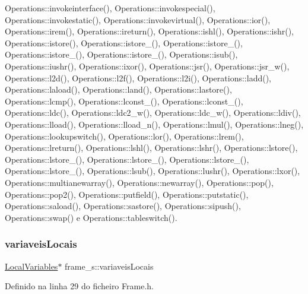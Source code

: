 Operations\+::invokeinterface(), Operations\+::invokespecial(), Operations\+::invokestatic(), Operations\+::invokevirtual(), Operations\+::ior(), Operations\+::irem(), Operations\+::ireturn(), Operations\+::ishl(), Operations\+::ishr(), Operations\+::istore(), Operations\+::istore\+\_(), Operations\+::istore\+\_(), Operations\+::istore\+\_(), Operations\+::istore\+\_(), Operations\+::isub(), Operations\+::iushr(), Operations\+::ixor(), Operations\+::jsr(), Operations\+::jsr\+\_\+w(), Operations\+::l2d(), Operations\+::l2f(), Operations\+::l2i(), Operations\+::ladd(), Operations\+::laload(), Operations\+::land(), Operations\+::lastore(), Operations\+::lcmp(), Operations\+::lconst\+\_(), Operations\+::lconst\+\_(), Operations\+::ldc(), Operations\+::ldc2\+\_\+w(), Operations\+::ldc\+\_\+w(), Operations\+::ldiv(), Operations\+::lload(), Operations\+::lload\+\_\+n(), Operations\+::lmul(), Operations\+::lneg(), Operations\+::lookupswitch(), Operations\+::lor(), Operations\+::lrem(), Operations\+::lreturn(), Operations\+::lshl(), Operations\+::lshr(), Operations\+::lstore(), Operations\+::lstore\+\_(), Operations\+::lstore\+\_(), Operations\+::lstore\+\_(), Operations\+::lstore\+\_(), Operations\+::lsub(), Operations\+::lushr(), Operations\+::lxor(), Operations\+::multianewarray(), Operations\+::newarray(), Operations\+::pop(), Operations\+::pop2(), Operations\+::putfield(), Operations\+::putstatic(), Operations\+::saload(), Operations\+::sastore(), Operations\+::sipush(), Operations\+::swap() e Operations\+::tableswitch().

\mbox{\label{structframe__s_a7d14a487bba511d5768e6d1b6b6f8be0}} 
\subsubsection{\texorpdfstring{variaveis\+Locais}{variaveisLocais}}
{\footnotesize\ttfamily \hyperlink{classLocalVariables}{Local\+Variables}$\ast$ frame\+\_\+s\+::variaveis\+Locais}



Definido na linha 29 do ficheiro Frame.\+h.



